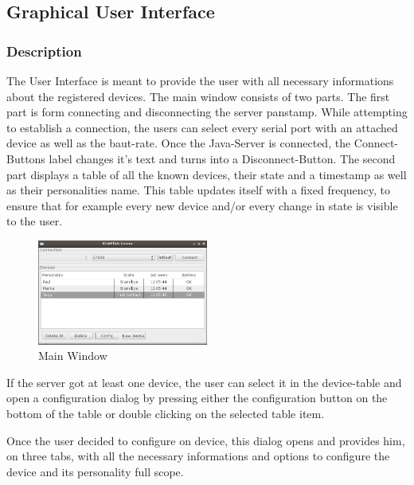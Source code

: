 \subsection{Graphical User Interface}
\subsubsection{Description}
The User Interface is meant to provide the user with all necessary informations about the registered devices. The main window consists of two parts. 
The first part is form connecting and disconnecting the server panstamp. While attempting to establish a connection, the users can select every serial port with an attached device as well as the baut-rate. Once the Java-Server is connected, the Connect-Buttons label changes it's text and turns into a Disconnect-Button.
The second part displays a table of all the known devices, their state and a timestamp as well as their personalities name. This table updates itself with a fixed frequency, to ensure that for example every new device and/or every change in state is visible to the user.

\begin{figure}[h!]
 \centering
 \includegraphics[width= 0.5\textwidth, clip=true  ,keepaspectratio=true]{./pic/java-server-main.png}
 \caption{Main Window}
 \label{fig:java-server-main}
\end{figure}



If the server got at least one device, the user can select it in the device-table and open a configuration dialog by pressing either the configuration button on the bottom of the table or double clicking on the selected table item.

Once the user decided to configure on device, this dialog opens and provides him, on three tabs, with all the necessary informations and options to configure the device and its personality full scope. %


